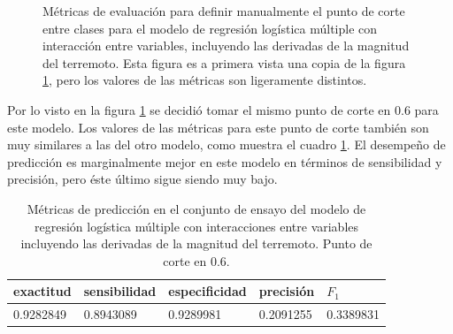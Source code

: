 \documentclass[a4paper]{report}
\begin{document}
\begin{figure}[!ht]
	\centering
	
	\vspace{-0.8cm}
	\caption{Métricas de evaluación para definir manualmente el punto de corte entre clases para el modelo de regresión logística múltiple con interacción entre variables, incluyendo las derivadas de la magnitud del terremoto.
	Esta figura es a primera vista una copia de la figura \ref{fig:múltiple_metrics_derivadas}, pero los valores de las métricas son ligeramente distintos.
	}
	\label{fig:múltiple_metrics_derivadas}
\end{figure}

Por lo visto en la figura \ref{fig:múltiple_metrics_derivadas} se decidió tomar el mismo punto de corte en \num{0.6} para este modelo.
Los valores de las métricas para este punto de corte también son muy similares a las del otro modelo, como muestra el cuadro \ref{tab:múltiple_metrics_derivadas}.
El desempeño de predicción es marginalmente mejor en este modelo en términos de sensibilidad y precisión, pero éste último sigue siendo muy bajo.

\begin{table}[!ht]
	\centering
	\begin{tabular}{lllll}
		\toprule
		exactitud & sensibilidad & especificidad & precisión & \(F_1\) \\
		\midrule
		\num{0.9282849} & \num{0.8943089} & \num{0.9289981} & \num{0.2091255} & \num{0.3389831}\\
		\bottomrule
	\end{tabular}
	\caption{Métricas de predicción en el conjunto de ensayo del modelo de regresión logística múltiple con interacciones entre variables incluyendo las derivadas de la magnitud del terremoto. Punto de corte en \num{0.6}.
	}
	\label{tab:múltiple_metrics_derivadas}
\end{table}
\end{document}
